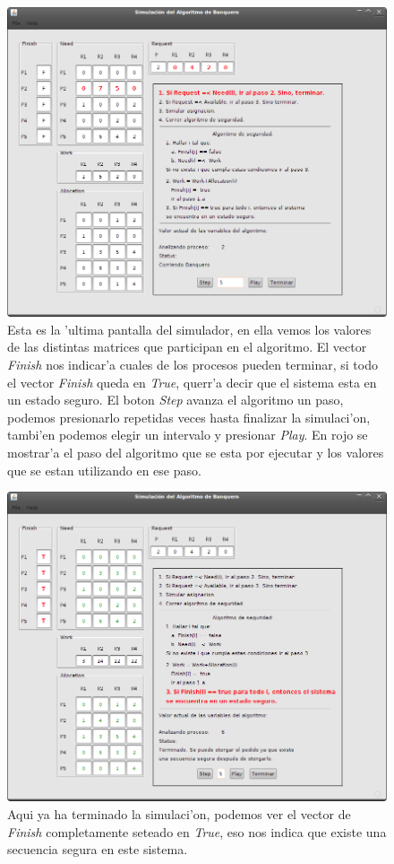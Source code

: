 \begin{figure}
\centering
 \includegraphics[scale=0.4,keepaspectratio=true]{./imagenes/banquero/banquero3.png}
 \caption{Esta es la 'ultima pantalla del simulador, en ella vemos los valores de las distintas matrices que participan en el algoritmo. El vector \emph{Finish} nos indicar'a cuales de los procesos pueden terminar, si todo el vector \emph{Finish} queda en \emph{True}, querr'a decir que el sistema esta en un estado seguro. El boton \emph{Step} avanza el algoritmo un paso, podemos presionarlo repetidas veces hasta finalizar la simulaci'on, tambi'en podemos elegir un intervalo y presionar \emph{Play}. En rojo se mostrar'a el paso del algoritmo que se esta por ejecutar y los valores que se estan utilizando en ese paso.} 
\end{figure}
\begin{figure}
\centering
 \includegraphics[scale=0.4,keepaspectratio=true]{./imagenes/banquero/banquero4.png}
 \caption{Aqui ya ha terminado la simulaci'on, podemos ver el vector de \emph{Finish} completamente seteado en \emph{True}, eso nos indica que existe una secuencia segura en este sistema.} 
\end{figure}